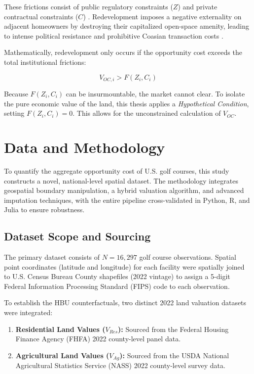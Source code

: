 \documentclass[10pt, letterpaper]{article}
\begin{document}
These frictions consist of public regulatory constraints ($Z$) and private contractual constraints ($C$) \parencite{Ellickson2022, Korngold2024}. Redevelopment imposes a negative externality on adjacent homeowners by destroying their capitalized open-space amenity, leading to intense political resistance and prohibitive Coasian transaction costs \parencite{Coase1960}.

Mathematically, redevelopment only occurs if the opportunity cost exceeds the total institutional frictions:

\begin{equation}
    V_{OC, i} > F(Z_i, C_i)
\end{equation}

Because $F(Z_i, C_i)$ can be insurmountable, the market cannot clear. To isolate the pure economic value of the land, this thesis applies a \textit{Hypothetical Condition}, setting $F(Z_i, C_i) = 0$. This allows for the unconstrained calculation of $V_{OC}$.

\newpage

\section{Data and Methodology}

To quantify the aggregate opportunity cost of U.S. golf courses, this study constructs a novel, national-level spatial dataset. The methodology integrates geospatial boundary manipulation, a hybrid valuation algorithm, and advanced imputation techniques, with the entire pipeline cross-validated in Python, R, and Julia to ensure robustness.

\subsection{Dataset Scope and Sourcing}
The primary dataset consists of $N = 16,297$ golf course observations. Spatial point coordinates (latitude and longitude) for each facility were spatially joined to U.S. Census Bureau County shapefiles (2022 vintage) to assign a 5-digit Federal Information Processing Standard (FIPS) code to each observation.

To establish the HBU counterfactuals, two distinct 2022 land valuation datasets were integrated:
\begin{enumerate}
    \item \textbf{Residential Land Values ($V_{Res}$):} Sourced from the Federal Housing Finance Agency (FHFA) 2022 county-level panel data.
    \item \textbf{Agricultural Land Values ($V_{Ag}$):} Sourced from the USDA National Agricultural Statistics Service (NASS) 2022 county-level survey data.
\end{enumerate}
\end{document}
